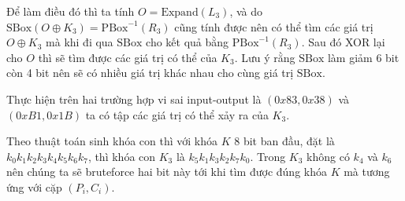 \documentclass{article}
\newcommand{\PBox}{\text{PBox}}
\newcommand{\SBox}{\text{SBox}}
\newcommand{\Expand}{\text{Expand}}
\begin{document}
Để làm điều đó thì ta tính $O = \Expand(L_3)$, và do $\SBox(O \oplus K_3) =
\PBox^{-1}(R_3)$ cũng tính được nên có thể tìm các giá trị $O \oplus K_3$ mà khi đi
qua $\SBox$ cho kết quả bằng $\PBox^{-1}(R_3)$. Sau đó XOR lại cho $O$ thì sẽ tìm
được các giá trị có thể của $K_3$. Lưu ý rằng $\SBox$ làm giảm 6 bit còn 4 bit nên
sẽ có nhiều giá trị khác nhau cho cùng giá trị $\SBox$.

Thực hiện trên hai trường hợp vi sai input-output là $(0x83, 0x38)$ và $(0xB1, 0x1B)$
ta có tập các giá trị có thể xảy ra của $K_3$.

Theo thuật toán sinh khóa con thì với khóa $K$ 8 bit ban đầu, đặt là $k_0 k_1 k_2 k_3
k_4 k_5 k_6 k_7$, thì khóa con $K_3$ là $k_5 k_1 k_3 k_2 k_7 k_0$. Trong $K_3$ không
có $k_4$ và $k_6$ nên chúng ta sẽ bruteforce hai bit này tới khi tìm được đúng khóa
$K$ mà tương ứng với cặp $(P_i, C_i)$.
\end{document}
